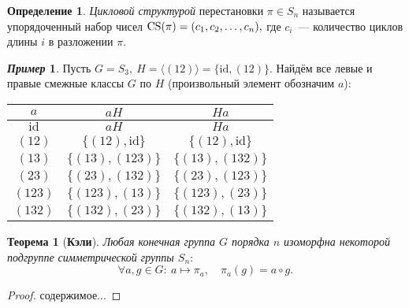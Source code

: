\documentclass[a4paper, 14pt]{extarticle}
\newcommand{\n}{\par}
\newcommand{\CS}{\mathrm{CS}}
\newcommand{\id}{\mathrm{id}}
\theoremstyle{definition}
\newtheorem*{exmpl*}{\textit{Пример}}
\newtheorem{definition}{Определение}
\theoremstyle{plain}
\newtheorem*{theorem*}{Теорема}
\numberwithin{theorem}{section}
\numberwithin{definition}{section}
\numberwithin{statement}{section}
\numberwithin{lemma}{section}
\numberwithin{consequence}{section}
\begin{document}
		\begin{definition}
			\textit{Цикловой структурой} перестановки ${\pi \in S_n}$ называется упорядоченный набор чисел ${\CS(\pi) = (c_1, c_2, \mathellipsis, c_n),}$ где $c_i$~--- количество циклов длины $i$ в разложении $\pi.$
		\end{definition}
		\newpage
		\begin{exmpl*}
			Пусть $G = S_3, \ H = \langle(12)\rangle = \{\id, (12)\}.$ Найдём все левые и правые смежные классы $G$ по $H$ (произвольный элемент обозначим $a$):
			\begin{center}
				\begin{tabular}{c|c|c}
					$a$ & $aH$ & $Ha$\\
					\hline
					$\id$ & $aH$ & $Ha$ \\
					\hline
					$(12)$ & $\{(12), \id\}$ & $\{(12), \id\}$ \\
					\hline
					$(13)$ & $\{(13), (123)\}$ & $\{(13), (132)\}$ \\
					\hline
					$(23)$ & $\{(23), (132)\}$ & $\{(23), (123)\}$ \\
					\hline
					$(123)$ & $\{(123), (13)\}$ & $\{(123), (23)\}$ \\
					\hline
					$(132)$ & $\{(132), (23)\}$ & $\{(132), (13)\}$
				\end{tabular}
			\end{center} \n
		\end{exmpl*}
			\begin{theorem*}[\textbf{Кэли}]
			Любая конечная группа $G$ порядка $n$ изоморфна некоторой подгруппе симметрической группы $S_n{:}$
			\begin{equation*}
			\forall a, g \in G{:} \ a \mapsto \pi_a, \quad \pi_a(g) = a \circ g.
			\end{equation*} \n
		\end{theorem*}
		\begin{proof}
			содержимое...
		\end{proof}
	\newpage
\end{document}
